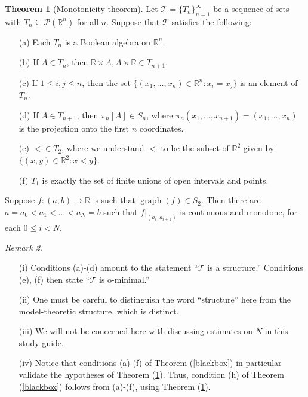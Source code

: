 \documentclass[12pt]{article}
\let\oldref\ref
\renewcommand{\ref}[1]{(\oldref{#1})}
\newcommand{\R}{\mathbb{R}}
\theoremstyle{definition}
\newtheorem{theorem}{Theorem}[section]
\theoremstyle{remark}
\newtheorem{remark}[theorem]{Remark}
\numberwithin{equation}{section}
\begin{document}
\begin{theorem}[Monotonicity theorem]\label{monotonethm} Let $\mathcal{T}=\{T_n\}_{n=1}^\infty$ be a sequence of sets with $T_n\subseteq\mathcal{P}(\R^n)$ for all $n$. Suppose that $\mathcal{T}$ satisfies the following:
\begin{itemize}
    \item[(a)] Each $T_n$ is a Boolean algebra on $\R^n$.
    \item[(b)] If $A\in T_n$, then $\R\times A,A\times\R\in T_{n+1}$.
    \item[(c)] If $1\leq i,j\leq n$, then the set $\{(x_1,\ldots,x_n)\in\R^n:x_i=x_j\}$ is an element of $T_n$.
    \item[(d)] If $A\in T_{n+1}$, then $\pi_n[A]\in S_n$, where $\pi_n(x_1,\ldots,x_{n+1})=(x_1,\ldots,x_n)$ is the projection onto the first $n$ coordinates.
    \item[(e)] $<\in T_2$, where we understand $<$ to be the subset of $\R^2$ given by $\{(x,y)\in\R^2:x<y\}$.
    \item[(f)] $T_1$ is exactly the set of finite unions of open intervals and points.
\end{itemize}

Suppose $f:(a,b)\to\R$ is such that $\operatorname{graph}(f)\in S_2$. Then there are $a=a_0<a_1<\ldots<a_N=b$ such that $\left.f\right|_{(a_i,a_{i+1})}$ is continuous and monotone, for each $0\leq i<N$.
    
\end{theorem}
\begin{remark}

    \begin{enumerate}
        \item[(i)] Conditions (a)-(d) amount to the statement ``$\mathcal{T}$ is a structure.'' Conditions (e), (f) then state ``$\mathcal{T}$ is o-minimal.''
        \item[(ii)] One must be careful to distinguish the word ``structure'' here from the model-theoretic structure, which is distinct.
        \item[(iii)] We will not be concerned here with discussing estimates on $N$ in this study guide.
        \item[(iv)] Notice that conditions (a)-(f) of Theorem \ref{blackbox} in particular validate the hypotheses of Theorem \ref{monotonethm}. Thus, condition (h) of Theorem \ref{blackbox} follows from (a)-(f), using Theorem \ref{monotonethm}.
    \end{enumerate}
\end{remark}
\end{document}
